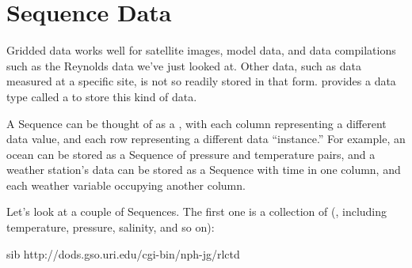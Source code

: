 \documentclass{dods-book}
\begin{document}





\section{Sequence Data}
\label{quick,sequences}

Gridded data works well for satellite images, model data, and data
compilations such as the Reynolds data we've just looked at.  Other
data, such as data measured at a specific site, is not so readily
stored in that form.  \opendap provides a data type called a 
to store this kind of data.

A Sequence can be thought of as a , with each
column representing a different data value, and each row representing
a different data ``instance.''  For example, an ocean  can be stored as a Sequence of pressure and temperature pairs,
and a weather station's data can be stored as a Sequence with time in
one column, and each weather variable occupying another column.

Let's look at a couple of Sequences.  The first one is a collection of
 (, including temperature, pressure,
salinity, and so on):

\begin{vcode}{sib}
http://dods.gso.uri.edu/cgi-bin/nph-jg/rlctd
\end{vcode}
\end{document}
